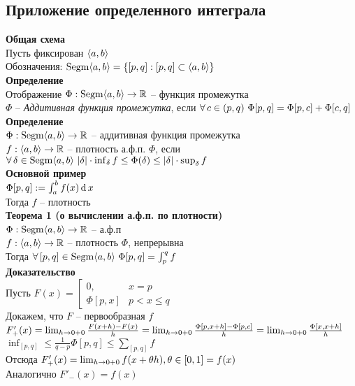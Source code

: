 \documentclass[12pt]{article}
\begin{document}
\subsection{Приложение определенного интеграла}
\textbf{Общая схема}\\
Пусть фиксирован $\langle a, b \rangle$\\
Обозначения: $\operatorname{Segm}\langle a, b \rangle = \{ [p,q]: [p,q] \subset \langle a, b \rangle\}$\\
\textbf{Определение}\\
Отображение $\Phi: \operatorname{Segm}\langle a, b \rangle \rightarrow \mathbb{R}$ -- функция промежутка\\
$\Phi$ -- \textit{Аддитивная функция промежутка}, если $\forall\, c \in (p,q)\ \Phi[p,q] = \Phi[p,c] + \Phi[c,q]$\\
\textbf{Определение}\\
$\Phi: \operatorname{Segm}\langle a, b \rangle \rightarrow \mathbb{R}$ -- аддитивная функция промежутка\\
$f: \langle a, b \rangle \rightarrow \mathbb{R}$ -- плотность а.ф.п. $\Phi$, если $\fall \delta \in \nm{Segm}\an ab\ |\delta|\cdot\inf_\delta f \leq \Phi(\delta) \leq |\delta|\cdot\sup_\delta f$\\
\textbf{Основной пример}\\
$\Phi[p,q] := \int_a^b f(x)\operatorname{d} x$\\
Тогда $f$ -- плотность\\
\textbf{Теорема 1 (о вычислении а.ф.п. по плотности)}\\
$\Phi: \operatorname{Segm}\langle a, b \rangle \rightarrow \mathbb{R}$ -- а.ф.п\\
$f: \langle a, b \rangle \rightarrow \mathbb{R}$ -- плотность $\Phi$, непрерывна\\
Тогда $\fall [p,q] \in \nm{Segm}\an ab\ \Phi[p,q] = \int_p^q f$\\
\textbf{Доказательство}\\
Пусть $F(x) = \left[\begin{array}{ll}
     0, & x = p \\
     \Phi[p,x] & p < x \leq q
\end{array}\right.$\\
Докажем, что $F$ -- первообразная $f$\\
$F'_+(x) = \lim_{h \rightarrow 0+0} \frac{F(x+h)-F(x)}{h} = \lim_{h \rightarrow 0+0} \frac{\Phi[p, x+h]-\Phi[p,c]}h = \lim_{h\rightarrow 0+0} \frac{\Phi[x, x+h]}{h}$\\
$\inf_{[p,q]} \leq \frac{1}{q-p}\Phi[p,q] \leq \sum_{[p,q]} f$\\
Отсюда $F'_+(x) = \lim_{h\rightarrow 0+0} f(x+\theta h), \theta \in [0,1] = f(x)$\\
Аналогично $F'_-(x) = f(x)$\\
\end{document}

